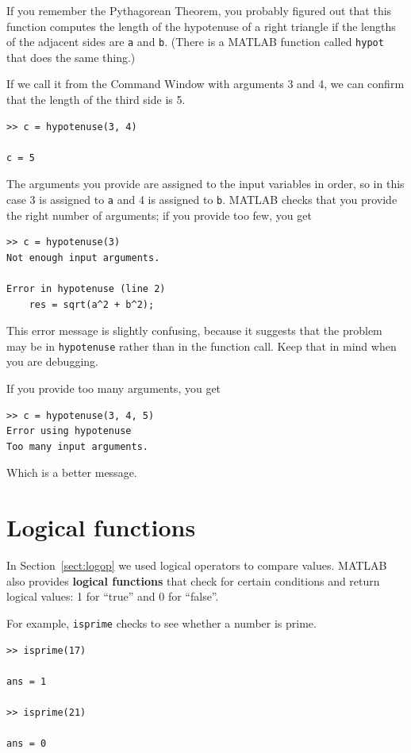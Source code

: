 \documentclass[
]{book}
\begin{document}
If you remember the Pythagorean Theorem, you probably figured out
that this function computes the length of the hypotenuse of a right
triangle if the lengths of the adjacent sides are {\tt a}
and {\tt b}.  (There is a MATLAB function called {\tt hypot} that does
the same thing.)

If we call it from the Command Window with arguments 3 and 4, we can
confirm that the length of the third side is 5.

\begin{verbatim}
>> c = hypotenuse(3, 4)

c = 5
\end{verbatim}

The arguments you provide are assigned to the input variables in
order, so in this case 3 is assigned to {\tt a} and 4 is assigned to
{\tt b}.  MATLAB checks that you provide the right number of arguments;
if you provide too few, you get

\begin{verbatim}
>> c = hypotenuse(3)
Not enough input arguments.

Error in hypotenuse (line 2)
    res = sqrt(a^2 + b^2);
\end{verbatim}

This error message is slightly confusing, because it suggests that
the problem may be in {\tt hypotenuse} rather than in the function call.
Keep that in mind when you are debugging.

If you provide too many arguments, you get

\begin{verbatim}
>> c = hypotenuse(3, 4, 5)
Error using hypotenuse
Too many input arguments.
\end{verbatim}

Which is a better message.


\section{Logical functions}

In Section~\ref{sect:logop} we used logical operators to compare values.
MATLAB also provides {\bf logical functions} that check for certain
conditions and return logical values: 1 for ``true'' and 0 for ``false''.

For example, {\tt isprime} checks to see whether a number is prime.

\begin{verbatim}
>> isprime(17)

ans = 1

>> isprime(21)

ans = 0
\end{verbatim}
\end{document}
